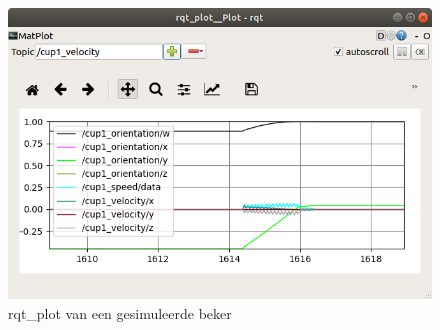 \documentclass[11pt,titlepage]{article}
\begin{document}
\begin{figure}[H]
\centering
    \includegraphics[scale = .4]{rqt_plot.png}
    \caption{rqt\_plot van een gesimuleerde beker}
    \label{figure:al5d_simulation}
\end{figure}
\end{document}
